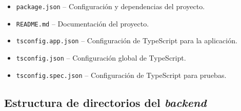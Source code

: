 \begin{itemize}
\begin{itemize}
        \item \texttt{package.json} -- Configuración y dependencias del proyecto.
        \item \texttt{README.md} -- Documentación del proyecto.
        \item \texttt{tsconfig.app.json} -- Configuración de TypeScript para la aplicación.
        \item \texttt{tsconfig.json} -- Configuración global de TypeScript.
        \item \texttt{tsconfig.spec.json} -- Configuración de TypeScript para pruebas.
    \end{itemize}
\end{itemize}


\subsection{Estructura de directorios del \textit{backend}}

